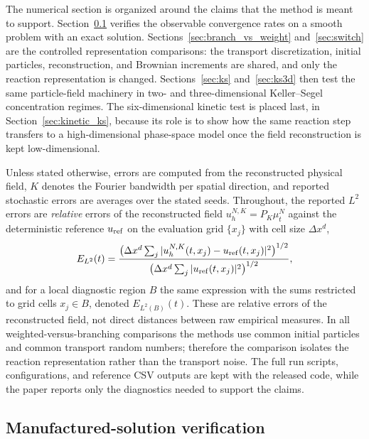 \documentclass[a4paper,fleqn]{cas-sc}
\theoremstyle{definition}
\theoremstyle{remark}
\begin{document}
The numerical section is organized around the claims that the method is meant to support.  Section~\ref{sec:mms} verifies the observable convergence rates on a smooth problem with an exact solution.  Sections~\ref{sec:branch_vs_weight} and~\ref{sec:switch} are the controlled representation comparisons: the transport discretization, initial particles, reconstruction, and Brownian increments are shared, and only the reaction representation is changed.  Sections~\ref{sec:ks} and~\ref{sec:ks3d} then test the same particle-field machinery in two- and three-dimensional Keller--Segel concentration regimes.  The six-dimensional kinetic test is placed last, in Section~\ref{sec:kinetic_ks}, because its role is to show how the same reaction step transfers to a high-dimensional phase-space model once the field reconstruction is kept low-dimensional.

Unless stated otherwise, errors are computed from the reconstructed physical field, $K$ denotes the Fourier bandwidth per spatial direction, and reported stochastic errors are averages over the stated seeds.  Throughout, the reported $L^2$ errors are \emph{relative} errors of the reconstructed field $u_h^{N,K}=P_K\mu_t^N$ against the deterministic reference $u_{\rm ref}$ on the evaluation grid $\{x_j\}$ with cell size $\Delta x^d$,
\begin{equation}
E_{L^2}(t)=\frac{\bigl(\Delta x^d\sum_j |u_h^{N,K}(t,x_j)-u_{\rm ref}(t,x_j)|^2\bigr)^{1/2}}{\bigl(\Delta x^d\sum_j |u_{\rm ref}(t,x_j)|^2\bigr)^{1/2}},
\label{equ:l2def}
\end{equation}
and for a local diagnostic region $B$ the same expression with the sums restricted to grid cells $x_j\in B$, denoted $E_{L^2(B)}(t)$.  These are relative errors of the reconstructed field, not direct distances between raw empirical measures.  In all weighted-versus-branching comparisons the methods use common initial particles and common transport random numbers; therefore the comparison isolates the reaction representation rather than the transport noise.  The full run scripts, configurations, and reference CSV outputs are kept with the released code, while the paper reports only the diagnostics needed to support the claims.

\subsection{Manufactured-solution verification}
\label{sec:mms}
\end{document}
